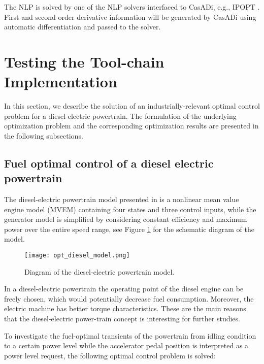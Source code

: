 The NLP is solved by one of the NLP solvers interfaced to CasADi, e.g., IPOPT \cite{wachter}. First and second order derivative information will be generated by CasADi using automatic differentiation and passed to the solver.

\section{Testing the Tool-chain Implementation}
\label{sec:optimizationtesting}

In this section, we describe the solution of an industrially-relevant optimal control problem for a diesel-electric powertrain. The
formulation of the underlying optimization problem and the corresponding optimization results are presented in the
following subsections.

\subsection{Fuel optimal control of a diesel electric powertrain}
\label{sec:optimizationdiesel}

The diesel-electric powertrain model presented in \cite{sivertsson,bernhard} is a nonlinear
mean value engine model (MVEM) containing four states and three control inputs, while the generator model is
simplified by considering constant efficiency and maximum power over the entire speed range, see Figure \ref{fig:dieselmodel} for the
schematic diagram of the model.

\begin{figure} [!h]
	\texttt{[image: opt\_diesel\_model.png]}
	\caption{Diagram of the diesel-electric powertrain model.}
	\label{fig:dieselmodel}
\end{figure}

In a diesel-electric powertrain the operating point of the diesel engine can be freely chosen, which would potentially
decrease fuel consumption. Moreover, the electric machine has better torque characteristics. These are the main reasons
that the diesel-electric power-train concept is interesting for further studies.

To investigate the fuel-optimal transients of the powertrain from idling condition to a certain power level while the
accelerator pedal position is interpreted as a power level request, the following optimal control problem is solved:

